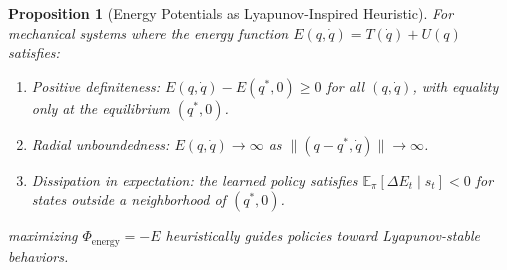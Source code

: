 \documentclass[journal]{IEEEtran}
\newtheorem{proposition}[theorem]{Proposition}
\begin{document}
	\begin{proposition}[Energy Potentials as Lyapunov-Inspired Heuristic]
		\label{prop:lyapunov_heuristic}
		For mechanical systems where the energy function $E(q,\dot{q}) = T(\dot{q}) + U(q)$ satisfies:
		\begin{enumerate}
			\item[\textit{(L1)}] \textit{Positive definiteness}: $E(q,\dot{q}) - E(q^*,0) \geq 0$ for all $(q,\dot{q})$, with equality only at the equilibrium $(q^*,0)$.
			\item[\textit{(L2)}] \textit{Radial unboundedness}: $E(q,\dot{q}) \to \infty$ as $\|(q-q^*,\dot{q})\| \to \infty$.
			\item[\textit{(L3)}] \textit{Dissipation in expectation}: the learned policy satisfies $\mathbb{E}_{\pi}[\Delta E_t \mid s_t] < 0$ for states outside a neighborhood of $(q^*,0)$.
		\end{enumerate}
		maximizing $\Phi_{\text{energy}}=-E$ heuristically guides policies toward Lyapunov-stable behaviors.
	\end{proposition}
	
\end{document}
